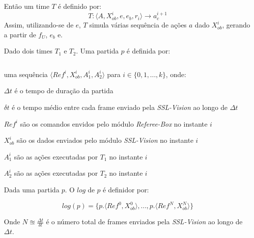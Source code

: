 \begin{defi}[Time]
\begin{description}
  \end{description}
  
  Então um time $T$ é definido por:
  \[
    T: \langle A, X_{ob}^{i}, e, e_b, r_i \rangle \longrightarrow a_c^{i+1}
  \]
  Assim, utilizando-se de $e$, $T$ simula várias sequência de ações $a$ dado $X_{ob}^{i}$,
  gerando  a partir de $f_{U}$, $e_b$ e.
\end{defi}

\begin{defi}[Partida]
  Dado dois times $T_1$ e $T_2$. Uma partida $p$ é definida por:
 
  
  \[
  \]
  
  uma sequência $\langle Ref^{i}, X_{ob}^{i}, A_1^{i}, A_2^{i} \rangle$ para
  $i \in \lbrace 0,1,...,k\rbrace$, onde:
  \begin{description}
    \item $\Delta t$ é o tempo de duração da partida
    \item $\delta t$ é o tempo médio entre cada frame enviado pela \textit{SSL-Vision} ao longo de $\Delta t$
    \item $Ref^{i}$ são os comandos envidos pelo módulo \textit{Referee-Box} no instante $i$
    \item $X_{ob}^{i}$ são os dados enviados pelo módulo \textit{SSL-Vision} no instante $i$
    \item $A_1^{i}$ são as ações executadas por $T_1$ no instante $i$
    \item $A_2^{i}$ são as ações executadas por $T_2$ no instante $i$
  \end{description}
\end{defi}

\begin{defi}[Logs]
  Dada uma partida $p$. O $log$ de $p$ é definidor por:

  \[
    log(p) = \lbrace p.\langle Ref^{0}, X_{ob}^{0}\rangle, ..., p.\langle Ref^{N}, X_{ob}^{N}\rangle \rbrace
  \]

  Onde $N \approxeq \frac{\Delta t}{\delta t}$ é o número total de frames enviados pela \textit{SSL-Vision}
  ao longo de $\Delta t$.
\end{defi}